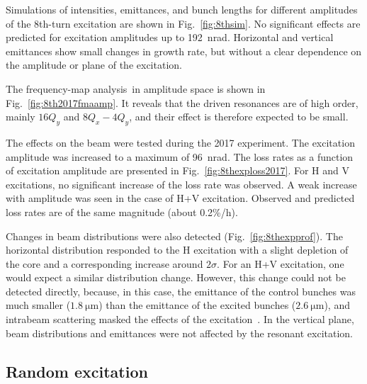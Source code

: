 \documentclass[%
 reprint,
 amsmath,amssymb,
 aps,
prstab,
longbibliography
]{revtex4-1}
\newcommand{\q}[2]{\ensuremath{#1\ \mathrm{#2}}} %
\newcommand{\fma}{frequency-map analysis}
\begin{document}
Simulations of intensities, emittances, and bunch lengths for
different amplitudes of the 8th-turn excitation are shown in
Fig.~\ref{fig:8thsim}. No significant effects are predicted for
excitation amplitudes up to 192~nrad. Horizontal and vertical
emittances show small changes in growth rate, but without a clear
dependence on the amplitude or plane of the excitation.

The \fma\ in amplitude space is shown in
Fig.~\ref{fig:8th2017fmaamp}. It reveals that the driven resonances
are of high order, mainly $16 Q_y$ and \mbox{$8 Q_x - 4 Q_y$}, and
their effect is therefore expected to be small.

The effects on the beam were tested during the 2017 experiment. The
excitation amplitude was increased to a maximum of 96~nrad. The loss
rates as a function of excitation amplitude are presented in
Fig.~\ref{fig:8thexploss2017}. For H and V excitations, no significant
increase of the loss rate was observed. A weak increase with amplitude
was seen in the case of H+V excitation. Observed and predicted loss
rates are of the same magnitude (about 0.2\%/h).

Changes in beam distributions were also detected
(Fig.~\ref{fig:8thexpprof}). The horizontal distribution responded to
the H excitation with a slight depletion of the core and a
corresponding increase around $2\sigma$. For an H+V excitation, one
would expect a similar distribution change. However, this change could
not be detected directly, because, in this case, the emittance of the
control bunches was much smaller (\q{1.8}{\mu m}) than the emittance
of the excited bunches (\q{2.6}{\mu m}), and intrabeam scattering
masked the effects of the excitation~\cite{resexmd2017}. In the
vertical plane, beam distributions and emittances were not affected
by the resonant excitation.



\subsection{Random excitation}
\label{sec:simexran}
\end{document}
